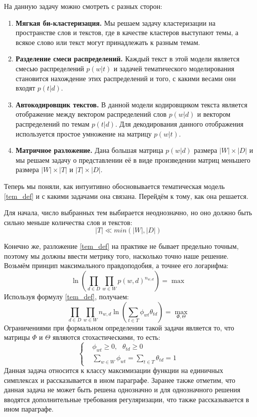 На данную задачу можно смотреть с разных сторон:
\begin{enumerate}
    \item \textbf{Мягкая би-кластеризация.} Мы решаем задачу кластеризации на пространстве слов и текстов, где в качестве кластеров выступают темы, а всякое слово или текст могут принадлежать к разным темам.
    \item \textbf{Разделение смеси распределений.} Каждый текст в этой модели является смесью распределений $p(w|t)$ и задачей тематического моделирования становится нахождение этих распределений и того, с какими весами они входят $p(t|d)$.
    \item \textbf{Автокодировщик текстов.} В данной модели кодировщиком текста является отображение между вектором распределений слов $p(w|d)$ и вектором распределений по темам $p(t|d)$. Для декодирования данного отображения используется простое умножение на матрицу $p(w|t)$.
    \item \textbf{Матричное разложение.} Дана большая матрица $p(w|d)$ размера $|W|\times|D|$ и мы решаем задачу о представлении её в виде произведении матриц меньшего размера $|W|\times|T|$ и $|T|\times|D|$.
\end{enumerate}

Теперь мы поняли, как интуитивно обосновывается тематическая модель \eqref{tem_def} и с какими задачами она связана. Перейдём к тому, как она решается.

Для начала, число выбранных тем выбирается неоднозначно, но оно должно быть сильно меньше количества слов и текстов:
\begin{equation}
    |T| \ll min(|W|, |D|)
\end{equation}

Конечно же, разложение \eqref{tem_def} на практике не бывает предельно точным, поэтому мы должны ввести метрику того, насколько точно наше решение. Возьмём принцип максимального правдоподобия, а точнее его логарифма:
\begin{equation}
    \ln\left(\prod\limits_{d\in D}\prod\limits_{w\in W} p(w, d)^{n_{w,d}}\right) = \max
\end{equation} 
Используя формулу \eqref{tem_def}, получаем:
\begin{equation}
    \prod\limits_{d\in D}\prod\limits_{w\in W}n_{w,d} \ln\left(\sum\limits_{t\in T} \phi_{wt} \theta_{td}\right) = \max\limits_{\Phi, \Theta}
\end{equation} 
Ограничениями при формальном определении такой задачи является то, что матрицы $\Phi$ и $\Theta$ являются стохастическими, то есть:
\begin{equation}
    \left\{
    \begin{aligned}
        &\phi_{wt} \geq 0, ~~~\theta_{td} \geq 0\\
        &\sum_{w\in W} \phi_{wt} = \sum_{t\in T} \theta_{td} = 1
    \end{aligned}
    \right.
\end{equation}
Данная задача относится к классу максимизации функции на единичных симплексах и рассказывается в ином параграфе. Заранее также отметим, что данная задача не может быть решена однозначно и для однозначного решения вводятся дополнительные требования регуляризации, что также рассказывается в ином параграфе.

